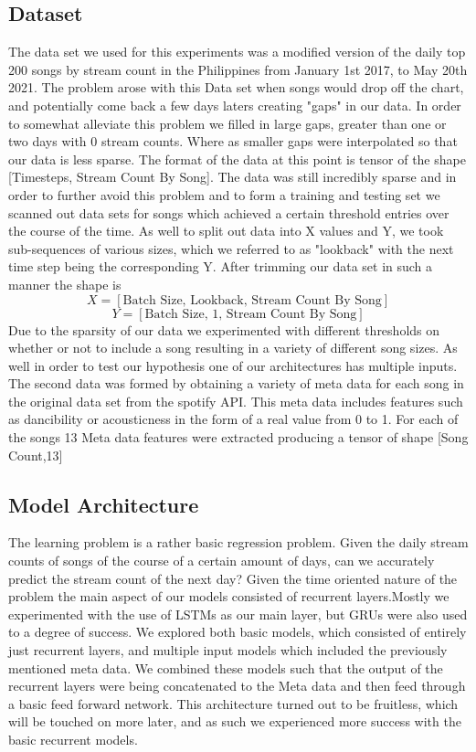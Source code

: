 \documentclass[11pt]{article}
\begin{document}
\subsection{Dataset}
The data set we used for this experiments was a modified version of the daily top 200 songs by stream count in the Philippines  from January 1st 2017, to May 20th 2021. The problem arose with this Data set when songs would drop off the chart, and potentially come back a few days laters creating "gaps" in our data. In order to somewhat alleviate this problem we filled in large gaps, greater than one or two days with 0 stream counts. Where as smaller gaps were interpolated so that our data is less sparse. The format of the data at this point is tensor of the shape [Timesteps, Stream Count By Song]. The data was still incredibly sparse and in order to further avoid this problem and to form a training and testing set we scanned out data sets for songs which achieved a certain threshold entries over the course of the time. As well to split out data into X values and Y, we took sub-sequences of various sizes, which we referred to as "lookback" with the next time step being the corresponding Y. After trimming our data set in such a manner the shape is 
\[X = [\text{Batch Size, Lookback, Stream Count By Song}]\]
\[Y = [\text{Batch Size, 1, Stream Count By Song}]\]
Due to the sparsity of our data we experimented with different thresholds on whether or not to include a song resulting in a variety of different song sizes. 
As well in order to test our hypothesis one of our architectures has multiple inputs. The second data was formed by obtaining a variety of meta data for each song in the original data set from the spotify API. This meta data includes features such as dancibility or acousticness in the form of a real value from 0 to 1. For each of the songs 13 Meta data features were extracted producing a tensor of shape [Song Count,13]

\subsection{Model Architecture}
The learning problem is a rather basic regression problem. Given the daily stream counts of songs of the course of a certain amount of days, can we accurately predict the stream count of the next day? Given the time oriented nature of the problem the main aspect of our models consisted of recurrent layers.Mostly we experimented with the use of LSTMs as our main layer, but GRUs were also used to a degree of success. We explored both basic models, which consisted of entirely just recurrent layers, and multiple input models which included the previously mentioned meta data. We combined these models such that the output of the recurrent layers were being concatenated to the Meta data and then feed through a basic feed forward network. This architecture turned out to be fruitless, which will be touched on more later, and as such we experienced more success with the basic recurrent models.
\end{document}
